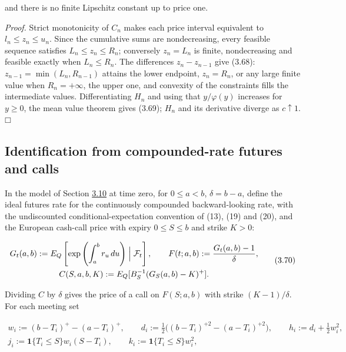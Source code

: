 \documentclass[11pt]{article}
\providecommand{\square}{\mdlgwhtsquare}
\begin{document}
and there is no finite Lipschitz constant up to price one.

\emph{Proof.} Strict monotonicity of \(C_n\) makes each price interval equivalent to \(l_n \le z_n \le u_n\). Since the cumulative sums are nondecreasing, every feasible sequence satisfies \(L_n \le z_n \le R_n\); conversely \(z_n = L_n\) is finite, nondecreasing and feasible exactly when \(L_n \le R_n\). The differences \(z_n - z_{n-1}\) give (3.68): \(z_{n-1} = \min(L_n, R_{n-1})\) attains the lower endpoint, \(z_n = R_n\), or any large finite value when \(R_n = +\infty\), the upper one, and convexity of the constraints fills the intermediate values. Differentiating \(H_n\) and using that \(y / \varphi(y)\) increases for \(y \ge 0\), the mean value theorem gives (3.69); \(H_n\) and its derivative diverge as \(c \uparrow 1\).\hfill$\square$

\subsection{Identification from compounded-rate futures and calls}\label{sec:3.16}

In the model of Section \hyperref[sec:3.10]{3.10} at time zero, for \(0 \le a < b\), \(\delta = b - a\), define the ideal futures rate for the continuously compounded backward-looking rate, with the undiscounted conditional-expectation convention of \cite{skov2021dynamic} (13), (19) and (20), and the European cash-call price with expiry \(0 \le S \le b\) and strike \(K > 0\):

\begin{equation*}
\begin{gathered}
G_t(a, b) := E_Q\left[ \exp\left( \int_a^b r_u\,du \right) \Bigm| \mathcal F_t \right], \qquad F(t; a, b) := \frac{G_t(a, b) - 1}{\delta}, \\
C(S, a, b, K) := E_Q[B_S^{-1} (G_S(a, b) - K)^+].
\end{gathered} \tag{3.70}\label{eq:3.70}
\end{equation*}

Dividing \(C\) by \(\delta\) gives the price of a call on \(F(S; a, b)\) with strike \((K - 1) / \delta\). For each meeting set

\begin{equation*}
\begin{gathered}
w_i := (b - T_i)^+ - (a - T_i)^+, \qquad d_i := \tfrac12 \bigl( (b - T_i)^{+2} - (a - T_i)^{+2} \bigr), \qquad h_i := d_i + \tfrac12 w_i^2, \\
j_i := \mathbf 1\{T_i \le S\} w_i (S - T_i), \qquad k_i := \mathbf 1\{T_i \le S\} w_i^2,
\end{gathered} \tag{3.71}\label{eq:3.71}
\end{equation*}
\end{document}
